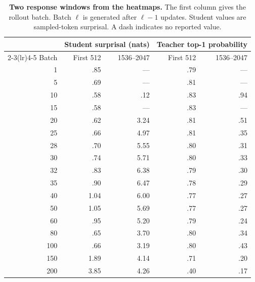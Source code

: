 \begin{table}[ht]
\centering\small
\setlength{\tabcolsep}{6pt}
\begin{tabular}{r rr rr}
\toprule
&\multicolumn{2}{c}{Student surprisal (nats)}&\multicolumn{2}{c}{Teacher top-1 probability}\\
\cmidrule(lr){2-3}\cmidrule(lr){4-5}
Batch & First 512 & 1536--2047 & First 512 & 1536--2047\\
\midrule
1 & .85 & --- & .79 & ---\\
5 & .69 & --- & .81 & ---\\
10 & .58 & .12 & .83 & .94\\
15 & .58 & --- & .83 & ---\\
20 & .62 & 3.24 & .81 & .51\\
25 & .66 & 4.97 & .81 & .35\\
28 & .70 & 5.55 & .80 & .31\\
30 & .74 & 5.71 & .80 & .33\\
32 & .83 & 6.38 & .79 & .30\\
35 & .90 & 6.47 & .78 & .29\\
40 & 1.04 & 6.00 & .77 & .27\\
50 & 1.05 & 5.69 & .77 & .27\\
60 & .95 & 5.20 & .79 & .24\\
80 & .65 & 3.70 & .80 & .34\\
100 & .66 & 3.19 & .80 & .43\\
150 & 1.89 & 4.14 & .71 & .20\\
200 & 3.85 & 4.26 & .40 & .17\\
\bottomrule
\end{tabular}
\caption{\textbf{Two response windows from the heatmaps.} The first column gives the rollout batch. Batch $\ell$ is generated after $\ell-1$ updates. Student values are sampled-token surprisal. A dash indicates no reported value.}
\label{tab:broadcast-onset}
\end{table}

